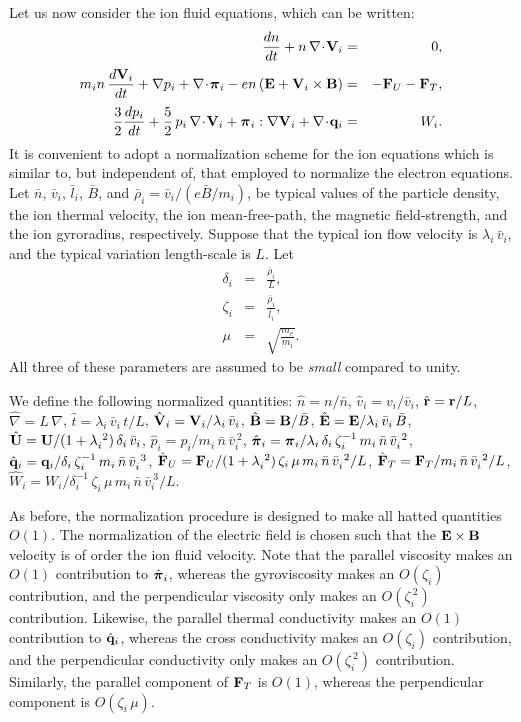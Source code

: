 Let us now consider the ion fluid equations, which can be written:
\begin{eqnarray}
\frac{dn}{dt} + n\,\nabla\!\cdot\!{\bf V}_i &=& 0,\\[0.5ex]
m_i n\,\frac{d {\bf V}_i}{dt} + \nabla p_i + \nabla\!\cdot \!\bpi_i - e n\,
({\bf E} + {\bf V}_i\times {\bf B})& =&- {\bf F}_U -{\bf F}_T,\\[0.5ex]
\frac{3}{2}\frac{d p_i}{dt} + \frac{5}{2}\,p_i\,\nabla\!\cdot\!{\bf V}_i
+ \bpi_i:\nabla{\bf V}_i+ \nabla\!\cdot\!{\bf q}_i &=& W_i.
\end{eqnarray}
It is convenient to adopt a normalization scheme for the ion equations
which is similar to, but independent of, that employed to normalize the
electron equations. Let  $\bar{n}$, $\bar{v}_i$, $\bar{l}_i$, $\bar{B}$,
and $\bar{\rho}_i =\bar{ v}_i/(e\bar{B}/m_i)$,  be typical values
of the particle density, the ion  thermal velocity, the ion
mean-free-path,  the magnetic field-strength, and the
ion gyroradius,  respectively. 
Suppose that the typical ion flow velocity is $\lambda_i\,\bar{v}_i$, and
the typical variation length-scale is $L$. Let
 \begin{eqnarray}
\delta_i &=& \frac{\bar{\rho}_i}{L},\\[0.5ex]
\zeta_i &=& \frac{\bar{\rho}_i}{\bar{l}_i},\\[0.5ex]
\mu &=& \sqrt{\frac{m_e}{m_i}}.
\end{eqnarray}
All three of these parameters are assumed to be {\em small}\/
compared to unity.

We
define the following normalized quantities: $\hat{n} = n/\bar{n}$,
$\hat{v}_i = v_i/\bar{v}_i$, $\hat{\bf r} = {\bf r}/ L$, 
$\hat{\nabla} = L\,\nabla$, $\hat{t} = \lambda_i\,\bar{v}_i\,t/L$, 
$\hat{\bf V}_i = {\bf V}_i/\lambda_i\,\bar{v}_i$, $\hat{\bf B}= {\bf B}
/\bar{B}$, $\hat{\bf E} = {\bf E}/ \lambda_i\,\bar{v}_i\,\bar{B}$,
$\hat{\bf U} ={\bf U} / (1+\lambda_i^{~2})\,\delta_i\,\bar{v}_i$, 
$\hat{p}_i = p_i/m_i\,\bar{n}\,\bar{v}_i^{~2}$, $\hat{\mbox{\boldmath$\pi$}}_i= \mbox{\boldmath$\pi$}_i
/\lambda_i\,\delta_i\,\zeta_i^{-1}\,m_i\,\bar{n}\,\bar{v}_i^{~2}$, 
$\hat{\bf q}_{i} = {\bf q}_{i} / \delta_i\,\zeta_i^{-1}\,
m_i\,\bar{n}\,\bar{v}_i^{~3}$,  
$\hat{\bf F}_U = {\bf F}_U/ (1+\lambda_i^{~2}) \,\zeta_i\,\mu\,
m_i\,\bar{n}\,\bar{v}_i^{~2}/L$, 
$\hat{\bf F}_T = {\bf F}_T/m_i\,\bar{n}\,\bar{v}_i^{~2}/L$,
$\hat{W}_i = W_i/\delta_i^{-1}\,\zeta_i\,\mu\, m_i\,\bar{n}\,\bar{v}_i^{~3}/L$.

As before, the normalization procedure is designed to make all hatted quantities $O(1)$.
The normalization of the electric field is chosen 
 such that the ${\bf E}\times{\bf B}$
velocity is of order the ion fluid velocity. Note that the parallel viscosity
makes an $O(1)$ contribution to $\hat{\mbox{\boldmath$\pi$}}_i$, whereas the gyroviscosity
makes an $O(\zeta_i)$ contribution, and the perpendicular viscosity only 
makes an $O(\zeta_i^{~2})$ contribution. Likewise, the parallel thermal
conductivity 
makes an $O(1)$ contribution to $\hat{\bf q}_{i}$, whereas the cross
conductivity 
makes an $O(\zeta_i)$ contribution, and the perpendicular conductivity only 
makes an $O(\zeta_i^{~2})$ contribution. Similarly, the parallel component
of ${\bf F}_T$ is  $O(1)$, whereas the perpendicular
component is  $O(\zeta_i\,\mu)$. 

